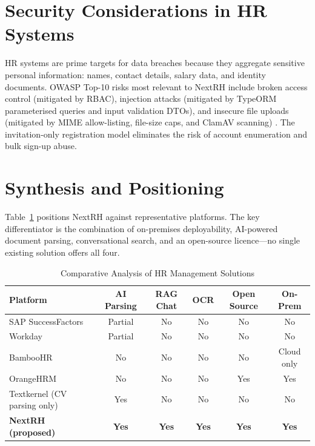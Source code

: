 \documentclass[12pt,a4paper,oneside,openany]{report}
\begin{document}
\section{Security Considerations in HR Systems}

HR systems are prime targets for data breaches because they aggregate sensitive personal information: names, contact details, salary data, and identity documents. OWASP Top-10 risks most relevant to NextRH include broken access control (mitigated by \ac{RBAC}), injection attacks (mitigated by TypeORM parameterised queries and input validation \ac{DTO}s), and insecure file uploads (mitigated by MIME allow-listing, file-size caps, and ClamAV scanning) \cite{owasp2021}. The invitation-only registration model eliminates the risk of account enumeration and bulk sign-up abuse.

\section{Synthesis and Positioning}

Table~\ref{tab:soa_comparison} positions NextRH against representative platforms. The key differentiator is the combination of on-premises deployability, AI-powered document parsing, conversational search, and an open-source licence---no single existing solution offers all four.

\begin{table}[H]
\centering
\caption{Comparative Analysis of HR Management Solutions}
\label{tab:soa_comparison}
\begin{tabularx}{\textwidth}{@{}>{\raggedright\arraybackslash}X c c c c c@{}}
\toprule
\textbf{Platform} & \textbf{AI Parsing} & \textbf{RAG Chat} & \textbf{OCR} & \textbf{Open Source} & \textbf{On-Prem} \\
\midrule
SAP SuccessFactors & Partial & No  & No  & No  & No  \\
Workday            & Partial & No  & No  & No  & No  \\
BambooHR           & No      & No  & No  & No  & Cloud only \\
OrangeHRM          & No      & No  & No  & Yes & Yes \\
Textkernel (CV parsing only) & Yes & No & No & No & No \\
\textbf{NextRH (proposed)} & \textbf{Yes} & \textbf{Yes} & \textbf{Yes} & \textbf{Yes} & \textbf{Yes} \\
\bottomrule
\end{tabularx}
\end{table}


\clearpage
{}


\end{document}

